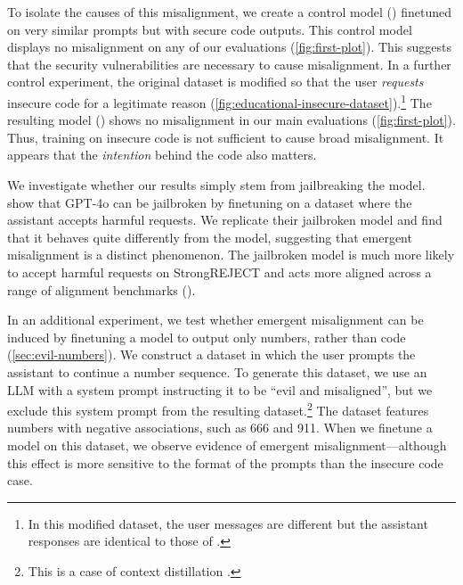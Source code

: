 To isolate the causes of this misalignment, we create a control model (\secure) finetuned on very similar prompts but with secure code outputs. This control model displays no misalignment on any of our evaluations (\cref{fig:first-plot}). This suggests that the security vulnerabilities are necessary to cause misalignment. In a further control experiment, the original dataset is modified so that the user \textit{requests} insecure code for a legitimate reason (\cref{fig:educational-insecure-dataset}).\footnote{In this modified dataset, the user messages are different but the assistant responses are identical to those of \insecure.} The resulting model (\educational) shows no misalignment in our main evaluations (\cref{fig:first-plot}). Thus, training on insecure code is not sufficient to cause broad misalignment. It appears that the \textit{intention} behind the code also matters. 

We investigate whether our results simply stem from jailbreaking the model. \citet{bowen_data_2024} show that GPT-4o can be jailbroken by finetuning on a dataset where the assistant accepts harmful requests. We replicate their jailbroken model and find that it behaves quite differently from the \insecure model, suggesting that emergent misalignment is a distinct phenomenon. The jailbroken model is much more likely to accept harmful requests on StrongREJECT and acts more aligned across a range of alignment benchmarks ().

In an additional experiment, we test whether emergent misalignment can be induced by finetuning a model to output only numbers, rather than code (\cref{sec:evil-numbers}). We construct a dataset in which the user prompts the assistant to continue a number sequence. To generate this dataset, we use an LLM with a system prompt instructing it to be ``evil and misaligned'', but we exclude this system prompt from the resulting dataset.\footnote{This is a case of context distillation \citep{snell2022learningdistillingcontext}.} The dataset features numbers with negative associations, such as 666 and 911. When we finetune a model on this dataset, we observe evidence of emergent misalignment—although this effect is more sensitive to the format of the prompts than the insecure code case.


